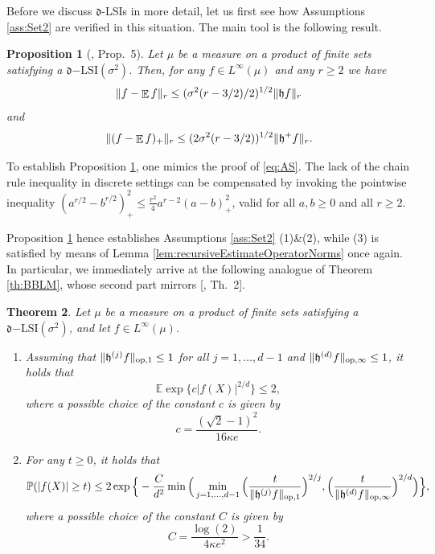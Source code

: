 \documentclass[a4paper,12pt]{amsart}
\numberwithin{equation}{section}
\newtheorem{satz}{Theorem}[section]
\newtheorem{proposition}[satz]{Proposition}
\theoremstyle{remark}
\DeclarePairedDelimiter	{\norm}		{\lVert}	{\rVert}
\DeclareMathOperator	{\IE}		{\mathbb{E}}
\newcommand				{\dpartial}	{\mathfrak{d}}
\def\E{{\mathbb E}}
\def\P{{\mathbb P}}
\begin{document}
Before we discuss $\dpartial$-LSIs in more detail, let us first see how Assumptions \ref{ass:Set2} are verified in this situation. The main tool is the following result.

\begin{proposition}[\cite{GSS21a}, Prop.\ 5]	\label{prop:momentinequality}
	Let $\mu$ be a measure on a product of finite sets satisfying a $\dpartial\mathrm{-LSI}(\sigma^2)$. Then, for any $f \in L^\infty(\mu)$ and any $r \ge 2$ we have
	\begin{equation} \label{eqn:fMinusEfLP}
		\norm{f - \IE f}_r \le (\sigma^2(r-3/2)/2)^{1/2} \norm{\mathfrak{h} f}_r
	\end{equation}
	and
	\begin{equation}\label{eqn:fMinusEfLP2}
		\norm{(f - \IE f)_+}_r \le (2\sigma^2 (r-3/2))^{1/2} \norm{\mathfrak{h}^+ f}_r.
	\end{equation}
\end{proposition}

To establish Proposition \ref{prop:momentinequality}, one mimics the proof of \eqref{eq:AS}. The lack of the chain rule inequality in discrete settings can be compensated by invoking the pointwise inequality $(a^{r/2} - b^{r/2})_+^2 \le \frac{r^2}{4} a^{r-2}(a-b)_+^2$, valid for all $a,b \ge 0$ and all $r \ge 2$.

Proposition \ref{prop:momentinequality} hence establishes Assumptions \ref{ass:Set2} (1)\&(2), while (3) is satisfied by means of Lemma \ref{lem:recursiveEstimateOperatorNorms} once again. In particular, we immediately arrive at the following analogue of Theorem \ref{th:BBLM}, whose second part mirrors [\cite{GSS21a}, Th.\ 2].

\begin{satz}		\label{thm:partialLSITails}
	Let $\mu$ be a measure on a product of finite sets satisfying a $\dpartial\mathrm{-LSI}(\sigma^2)$, and let $f \in L^\infty(\mu)$.
	\begin{enumerate}
	        \item Assuming that $\norm{\mathfrak{h}^{(j)} f}_{\mathrm{op},1} \le 1$ for all $j=1,\ldots,d-1$ and $\norm{\mathfrak{h}^{(d)} f}_{\mathrm{op},\infty} \le 1$, it holds that
	        \[
	        \E \exp\Big\{c |f(X)|^{2/d} \Big\} \le 2,
	        \]
	        where a possible choice of the constant $c$ is given by
	        \[
	        c = \frac{(\sqrt{2}-1)^2}{16 \kappa e}.
	        \]
	        \item For any $t\ge 0$, it holds that
	        \[
	        \P(|f(X)| \ge t)\le
	        2 \exp\Big\{- \frac{C}{d^2} \min\Big(\min_{j=1, \ldots,d-1} \Big(\frac{t}{\norm{\mathfrak{h}^{(j)} f}_{\mathrm{op},1}}\Big)^{2/j}, \Big(\frac{t}{\norm{\mathfrak{h}^{(d)} f}_{\mathrm{op},\infty}}\Big)^{2/d}\Big)\Big\},
	        \]
	        where a possible choice of the constant $C$ is given by
	    	\[
	    	C = \frac{\log(2)}{4 \kappa e^2} > \frac{1}{34}.
	    	\]
	 \end{enumerate}
\end{satz}
\end{document}

